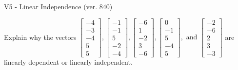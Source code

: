 \begin{exercise}
  \begin{exerciseTitle}V5 - Linear Independence (ver. 840)\end{exerciseTitle}
  \begin{exerciseStatement}
    Explain why the vectors \(\left[\begin{array}{r}
-4 \\
-3 \\
-4 \\
5 \\
5
\end{array}\right] , \left[\begin{array}{r}
-1 \\
-1 \\
5 \\
-2 \\
-4
\end{array}\right] , \left[\begin{array}{r}
-6 \\
1 \\
-2 \\
3 \\
-6
\end{array}\right] , \left[\begin{array}{r}
0 \\
-1 \\
5 \\
-4 \\
5
\end{array}\right] , \text{ and } \left[\begin{array}{r}
-2 \\
-6 \\
2 \\
3 \\
-3
\end{array}\right]\) are linearly dependent or linearly independent.	



\end{exerciseStatement}
\end{exercise}
